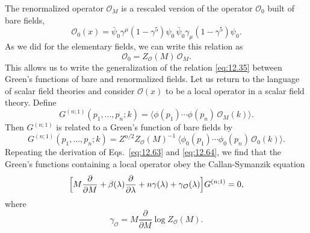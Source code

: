 The renormalized operator $\mathcal{O}_M$ is a rescaled version of the
operator $\mathcal{O}_0$ built of bare fields,
\begin{equation}
  \mathcal{O}_0(x) = \bar{\psi}_0\gamma^\mu(1-\gamma^5)\psi_0\,
    \bar{\psi}_0\gamma_\mu(1-\gamma^5)\psi_0 .
  \label{eq:12.102}
\end{equation}
As we did for the elementary fields, we can write this relation as
\begin{equation}
  \mathcal{O}_0 = Z_{\mathcal{O}}(M)\,\mathcal{O}_M .
  \label{eq:12.103}
\end{equation}
This allows us to write the generalization of the relation \eqref{eq:12.35}
between Green's functions of bare and renormalized fields.  Let us return to
the language of scalar field theories and consider $\mathcal{O}(x)$ to be a
local operator in a scalar field theory.  Define
\begin{equation}
  G^{(n;1)}(p_1, \ldots, p_n; k) = \bigl\langle \phi(p_1)\cdots\phi(p_n)\,
    \mathcal{O}_M(k) \bigr\rangle .
  \label{eq:12.104}
\end{equation}
Then $G^{(n;1)}$ is related to a Green's function of bare fields by
\begin{equation}
  G^{(n;1)}(p_1, \ldots, p_n; k) = Z^{n/2}Z_{\mathcal{O}}(M)^{-1}\
    \bigl\langle \phi_0(p_1)\cdots\phi_0(p_n)\,\mathcal{O}_0(k) \bigr\rangle .
  \label{eq:12.105}
\end{equation}
Repeating the derivation of Eqs.~\eqref{eq:12.63} and \eqref{eq:12.64}, we
find that the Green's functions containing a local operator obey the
Callan-Symanzik equation
\begin{equation}
  \Bigl[ M\frac{\partial}{\partial M} + \beta(\lambda)\frac{\partial}
    {\partial\lambda} + n\gamma(\lambda) + \gamma_{\mathcal{O}}(\lambda) \Bigr]
    G^{(n;1)} = 0 ,
  \label{eq:12.106}
\end{equation}
where
\begin{equation}
  \gamma_{\mathcal{O}} = M\frac{\partial}{\partial M}\log Z_{\mathcal{O}}(M)
  .
  \label{eq:12.107}
\end{equation}

